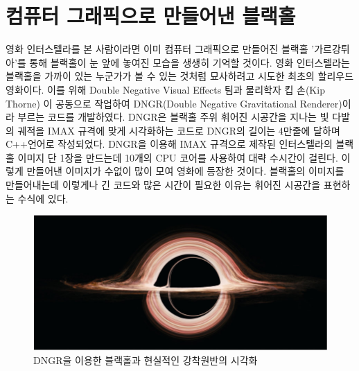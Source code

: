 \documentclass[
    aps,
    reprint,
    superscriptaddress,
    ]{revtex4-2}
\begin{document}
\section{컴퓨터 그래픽으로 만들어낸 블랙홀}
영화 인터스텔라를 본 사람이라면 이미 컴퓨터 그래픽으로 만들어진 블랙홀 '가르강튀아'를 통해
블랙홀이 눈 앞에 놓여진 모습을 생생히 기억할 것이다. 영화 인터스텔라는 블랙홀을 가까이 있는 누군가가
볼 수 있는 것처럼 묘사하려고 시도한 최초의 할리우드 영화이다. 이를 위해 Double Negative
Visual Effects 팀과 물리학자 킵 손(Kip Thorne)
이 공동으로 작업하여 
DNGR(Double Negative Gravitational Renderer)이라 부르는 코드를 개발하였다. 
DNGR은 블랙홀 주위 휘어진 시공간을 지나는 빛 다발의 궤적을 IMAX 규격에 맞게 시각화하는 코드로
DNGR의 길이는 4만줄에
달하며 C++언어로 작성되었다. DNGR을 이용해 IMAX 규격으로 제작된 인터스텔라의 블랙홀 이미지 단 1장을 
만드는데 10개의 CPU 코어를 사용하여 대략 수시간이 걸린다. 이렇게 만들어낸 이미지가 수없이 많이 모여
영화에 등장한 것이다. 블랙홀의 이미지를 만들어내는데 이렇게나 긴 코드와 많은 시간이 필요한 이유는
휘어진 시공간을 표현하는 수식에 있다.  
\begin{figure}[htp]
  \includegraphics[scale=1]{interstellar.png}
  \caption{DNGR을 이용한 블랙홀과 현실적인 강착원반의 시각화\cite{Janes}}
  \label{fig:5}
\end{figure}
\end{document}

